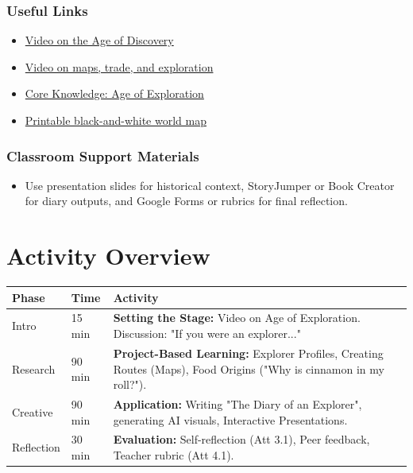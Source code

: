 \documentclass[11pt, a4paper]{article}
\begin{document}
\subsubsection*{Useful Links}
\begin{itemize}
    \item \href{https://www.youtube.com/watch?v=sGeXtUZQScc}{Video on the Age of Discovery}
    \item \href{https://www.youtube.com/watch?v=wTjgBrlhzRs}{Video on maps, trade, and exploration}
    \item \href{https://www.coreknowledge.org/free-resource/ckhg-unit-03-age-exploration/}{Core Knowledge: Age of Exploration}
    \item \href{https://www.printablee.com/post_black-and-white-world-map-printable_396505/}{Printable black-and-white world map}
\end{itemize}

\subsubsection*{Classroom Support Materials}
\begin{itemize}
    \item Use presentation slides for historical context, StoryJumper or Book Creator for diary outputs, and Google Forms or rubrics for final reflection.
\end{itemize}

\section*{Activity Overview}
\begingroup
\small
\begin{tabularx}{\textwidth}{|l|l|L|}
    \hline
     \textbf{Phase} & \textbf{Time} & \textbf{Activity} \\ \hline
    Intro & 15 min & \textbf{Setting the Stage:} Video on Age of Exploration. Discussion: "If you were an explorer..." \\ \hline
    Research & 90 min & \textbf{Project-Based Learning:} Explorer Profiles, Creating Routes (Maps), Food Origins ("Why is cinnamon in my roll?"). \\ \hline
    Creative & 90 min & \textbf{Application:} Writing "The Diary of an Explorer", generating AI visuals, Interactive Presentations. \\ \hline
    Reflection & 30 min & \textbf{Evaluation:} Self-reflection (Att 3.1), Peer feedback, Teacher rubric (Att 4.1). \\ \hline
\end{tabularx}
\endgroup
\end{document}
